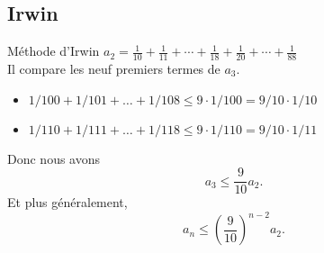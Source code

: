 \documentclass{beamer}
\begin{document}
%

\subsection{Irwin}

\begin{frame}{M\'ethode d'Irwin}
	\( a_2 = \frac{1}{10} + \frac{1}{11} + \cdots + \frac{1}{18} + \frac{1}{20}
	+ \cdots+ \frac{1}{88}	\)\\

	Il compare les neuf premiers termes de $a_{3}$.

	\begin{itemize}
		\item $1/100 + 1/101 + \dots + 1/108 \le 9 \cdot 1/100=9/10 \cdot 1/10$ 
		\item $1/110 + 1/111 + \dots + 1/118 \le 9 \cdot 1/110=9/10 \cdot 1/11$
	\end{itemize}
	Donc nous avons
	\[
		a_{3} \le \frac{9}{10}a_{2}.
	\]
	Et plus généralement,
	\[
		a_{n} \le \left( \frac{9}{10} \right)^{n-2} a_{2}.
	\]
\end{frame}
\end{document}
